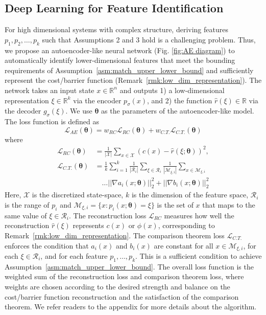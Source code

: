 \documentclass[letterpaper]{article} %
\begin{document}
\subsection{Deep Learning for Feature Identification}
For high dimensional systems with complex structure, deriving features $p_1, p_2, \ldots, p_k$ such that Assumptions 2 and 3 hold is a challenging problem.  Thus, we propose an autoencoder-like neural network (Fig. \ref{fig:AE diagram}) to automatically identify lower-dimensional features that meet the bounding  requirements of Assumption~\ref{asm:match_upper_lower_bound} and sufficiently represent the cost/barrier function (Remark~\ref{rmk:low_dim_representation}). The network takes an input state $x\in\mathbb{R}^n$ and outputs 1) a low-dimensional representation $\xi\in\mathbb{R}^k$ via the encoder $p_\sigma(x)$, and 2) the function $\hat{r}(\xi)\in\mathbb{R}$ via the decoder $g_\sigma(\xi)$. We use $\boldsymbol \theta$ as the parameters of the autoencoder-like model. The loss function is defined as 
\begin{equation}\label{eq: AE Loss}
    \mathcal{L}_{AE}(\boldsymbol\theta) = w_{RC}\mathcal{L}_{RC}(\boldsymbol\theta) + w_{C.T.}\mathcal{L}_{C.T.}(\boldsymbol\theta)
\end{equation}
where
\begin{align} 
    \mathcal{L}_{RC}(\boldsymbol\theta) &= \frac{1}{|\mathcal{X}|}\sum_{x\in\mathcal{X}}\left(c(x)-\hat{r}(\xi; \boldsymbol\theta)\right)^2, \label{eq: RC loss} \\
    \mathcal{L}_{C.T.}(\boldsymbol\theta) &= \frac{1}{k}\sum_{i=1}^k\frac{1}{|\mathcal{R}_i|}\sum_{\xi\in\mathcal{R}_i}\frac{1}{|\mathcal{M}_{\xi, i}|}\sum_{x\in\mathcal{M}_{\xi, i}} \label{eq: CT loss} \\
    & \quad \ldots ||\nabla a_i(x; \boldsymbol\theta) ||_2^2 + || \nabla b_i(x; \boldsymbol\theta)||_2^2 \nonumber
\end{align}   
Here, $\mathcal{X}$ is the discretized state-space, $k$ is the dimension of the feature space, $\mathcal{R}_i$ is the range of $p_i$ and $\mathcal{M}_{\xi, i}=\{x: p_i(x; \boldsymbol\theta)=\xi\}$ is the set of $x$ that maps to the same value of $\xi\in\mathcal{R}_i$. The reconstruction loss $\mathcal{L}_{RC}$ measures how well the reconstruction $\hat{r}(\xi)$ represents $c(x)$ or $\phi(x)$, corresponding to Remark~\ref{rmk:low_dim_representation}. The comparison theorem loss $\mathcal{L}_{C.T.}$ enforces the condition that $a_i(x)$ and $b_i(x)$ are constant for all $x\in \mathcal{M}_{\xi, i}$, for each $\xi\in\mathcal{R}_i$, and for each feature $p_1,\ldots,p_k$. This is a sufficient condition to achieve Assumption~\ref{asm:match_upper_lower_bound}. The overall loss function is the weighted sum of the reconstruction loss and comparison theorem loss, where weights are chosen according to the desired strength and balance on the cost/barrier function reconstruction and the satisfaction of the comparison theorem. We refer readers to the appendix for more details about the algorithm. 
\end{document}

